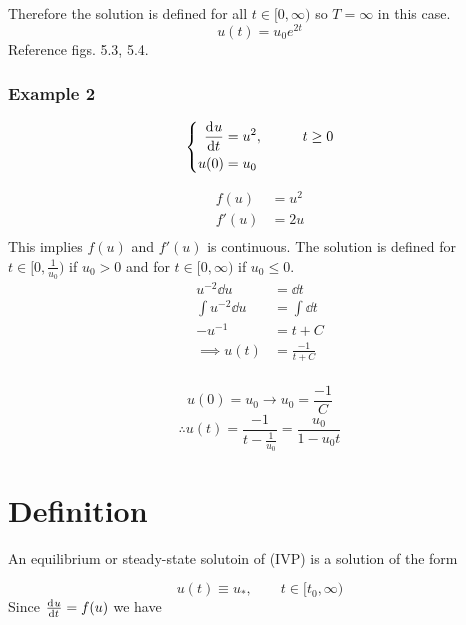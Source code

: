 \documentclass[12pt]{article}
\begin{document}
      Therefore the solution is defined for all $t\in[0,\infty)$ so $T=\infty$
      in this case.
      \begin{equation}
        u(t) = u_0e^{2t}
      \end{equation}
      Reference figs. 5.3, 5.4.

      \subsubsection{Example 2}
      \begin{equation} \left\{
        \begin{aligned}
          \frac{\mathrm{d}^{} {u}}{\mathrm{d}{t}^{}} &= u^2, &\qquad t\ge0 \\
          u(0) &= u_0 \\
        \end{aligned} \right.
      \end{equation}

      \begin{equation}
        \begin{aligned}
          f(u) &= u^2 \\
          f'(u) &= 2u \\
        \end{aligned}
      \end{equation}
      This implies $f(u)$ and $f'(u)$ is continuous. The solution is defined for
      $t\in[0,\frac{1}{u_0})$ if $u_0>0$ and for $t\in[0,\infty)$ if $u_0\le0$.
      \begin{equation}
        \begin{aligned}
          u^{-2} \dd{u} &= \dd{t} \\
          \int u^{-2} \dd{u} &= \int \dd{t} \\
          -u^{-1} &= t+C \\
          \implies u(t) &= \frac{-1}{t+C} \\
        \end{aligned}
      \end{equation}

      $$u(0) = u_0 \rightarrow u_0 = \frac{-1}{C}$$
      $$\therefore u(t) = \frac{-1}{t-\frac{1}{u_0}} = \frac{u_0}{1-u_0t}$$

      \section{Definition}
      An equilibrium or steady-state solutoin of (IVP) is a solution of the form

      $$u(t) \equiv u_*,\qquad t\in[t_0,\infty)$$
        Since $\frac{\mathrm{d}^{} {u}}{\mathrm{d}{t}^{}}=f(u)$ we have \todo
\end{document}
